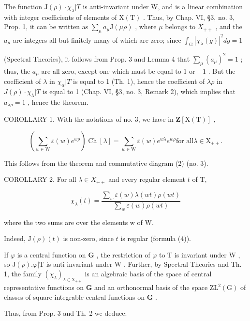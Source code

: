 The function \(\mathrm{J}(\rho)\cdot\chi_{\lambda}|T\) is anti-invariant under W, and is a linear combination with integer coefficients of elements of \(\mathrm{X(T)}\) . Thus, by Chap. VI, §3, no. 3, Prop. 1, it can be written as \(\sum_{\mu}a_{\mu}\mathrm{J}(\mu\rho)\) , where \(\mu\) belongs to \(X_{++}\) , and the \(a_{\mu}\) are integers all but finitely-many of which are zero; since \(\int_{\mathrm{G}}|\chi_{\lambda}(g)|^{2}dg=1\)

(Spectral Theories), it follows from Prop. 3 and Lemma 4 that \(\sum_{\mu}(a_{\mu})^{2} = 1\) ; thus, the \(a_{\mu}\) are all zero, except one which must be equal to 1 or \(-1\) . But the coefficient of \(\lambda\) in \(\chi_{\alpha}|T\) is equal to 1 (Th. 1), hence the coefficient of \(\lambda \rho\) in \(J(\rho)\cdot \chi_{\lambda}|T\) is equal to 1 (Chap. VI, §3, no. 3, Remark 2), which implies that \(a_{\lambda \rho} = 1\) , hence the theorem.

COROLLARY 1. With the notations of no. 3, we have in \(\mathbf{Z}[\mathrm{X(T)}]\) ,

\[
\left(\sum_ {w \in \mathrm{W}} \varepsilon (w) e ^ {w \rho}\right) \operatorname{Ch} [ \lambda ] = \sum_ {w \in \mathrm{W}} \varepsilon (w) e ^ {w \lambda} e ^ {w \rho} \text {for all} \lambda \in \mathrm{X} _ {+ +}.
\]

This follows from the theorem and commutative diagram (2) (no. 3).

COROLLARY 2. For all \(\lambda \in X_{++}\) and every regular element \(t\) of T,

\[
\chi_ {\lambda} (t) = \frac {\sum_ {w} \varepsilon (w) \lambda (w t) \rho (w t)}{\sum_ {w} \varepsilon (w) \rho (w t)}\tag{5}
\]

where the two sums are over the elements w of W.

Indeed, \(\mathrm{J}(\rho)(t)\) is non-zero, since \(t\) is regular (formula (4)).

If \(\varphi\) is a central function on \(\mathbf{G}\) , the restriction of \(\varphi\) to \(\mathrm{T}\) is invariant under \(\mathrm{W}\) , so \(\mathrm{J}(\rho). \varphi|\mathrm{T}\) is anti-invariant under \(\mathrm{W}\) . Further, by Spectral Theories and Th. 1, the family \((\chi_{\lambda})_{\lambda \in \mathrm{X}_{++}}\) is an algebraic basis of the space of central representative functions on \(\mathbf{G}\) and an orthonormal basis of the space \(\mathrm{ZL}^2(\mathrm{G})\) of classes of square-integrable central functions on \(\mathbf{G}\) .

Thus, from Prop. 3 and Th. 2 we deduce:

